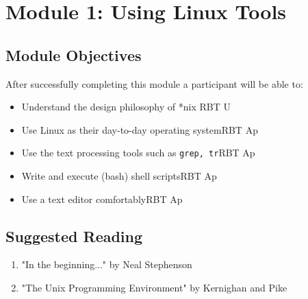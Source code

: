 \documentclass{article}
\begin{document}
\section{Module 1: Using Linux Tools}
\label{ULT}
\subsection{Module Objectives}
After successfully completing this module a participant will be able to:
	\begin{itemize}
	\item Understand the design philosophy of *nix \hfill RBT U\phantom{p}
	\item Use Linux as their day-to-day operating system\hfill RBT Ap
	\item Use the text processing tools such as \texttt{grep, tr}\hfill RBT Ap
	\item Write and execute (bash) shell scripts\hfill RBT Ap
	\item Use a text editor comfortably\hfill RBT Ap
	\end{itemize}
\subsection{Suggested Reading}
\begin{enumerate}
	\item "In the beginning..." by Neal Stephenson
	\item "The Unix Programming Environment" by Kernighan and Pike
\end{enumerate}
\end{document}
